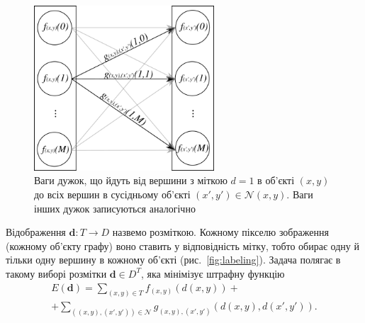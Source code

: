 \begin{figure}[h]
  \centering
  \includegraphics[width=0.6\textwidth]{images/neighbor_edge_weights}
  \caption{Ваги дужок, що йдуть від вершини з міткою $d = 1$ в об'єкті
           $\left(x, y \right)$ до всіх вершин в сусідньому об'єкті
           $\left(x', y' \right) \in \mathcal{N}\left(x, y \right)$.
           Ваги інших дужок записуються аналогічно}
  \label{fig:neighbor:edge:weights}
\end{figure}

Відображення $\pmb{d} : T \rightarrow D$ назвемо розміткою.
Кожному пікселю зображення (кожному об'єкту графу)
воно ставить у відповідність мітку,
тобто обирає одну й тільки одну вершину в кожному об'єкті
(рис.~\ref{fig:labeling}).
Задача полягає в такому виборі розмітки $\pmb{d} \in D^T$,
яка мінімізує штрафну функцію
\begin{equation} \label{eq:overview:penalty}
\begin{gathered}
    E \left( \pmb{d} \right)
    = \sum \limits_{\left(x, y \right) \in T}
        f_{\left(x, y \right)} \left(d \left(x, y \right) \right) + \\
    + \sum \limits_{\left(\left(x, y \right), \left(x', y'\right) \right) \in \mathcal{N}}
        g_{\left(x, y \right), \left(x', y' \right)} \left(
            d \left( x, y \right), d \left( x', y' \right)
        \right).
\end{gathered}
\end{equation}

